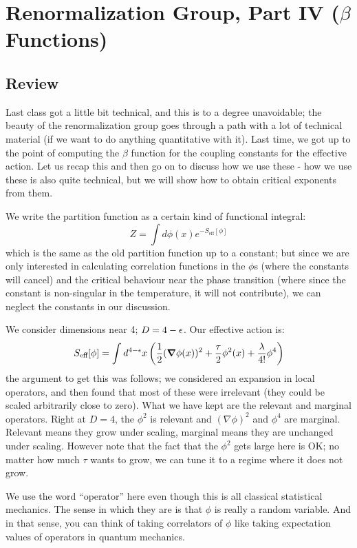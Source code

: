 \section{Renormalization Group, Part IV ($\beta$ Functions)}
\subsection{Review}
Last class got a little bit technical, and this is to a degree unavoidable; the beauty of the renormalization group goes through a path with a lot of technical material (if we want to do anything quantitative with it). Last time, we got up to the point of computing the $\beta$ function for the coupling constants for the effective action. Let us recap this and then go on to discuss how we use these - how we use these is also quite technical, but we will show how to obtain critical exponents from them.

We write the partition function as a certain kind of functional integral:
\begin{equation}
    Z = \int d\phi(x)e^{-S_{\text{eff}}[\phi]}
\end{equation}
which is the same as the old partition function up to a constant; but since we are only interested in calculating correlation functions in the $\phi$s (where the constants will cancel) and the critical behaviour near the phase transition (where since the constant is non-singular in the temperature, it will not contribute), we can neglect the constants in our discussion.

We consider dimensions near 4; $D = 4 - \epsilon$. Our effective action is:
\begin{equation}\label{eq-oldtheory}
    S_{\text{eff}}[\phi] = \int d^{4-\e}x \left(\frac{1}{2}(\nabla \phi(x))^2 + \frac{\tau}{2}\phi^2(x) + \frac{\lambda}{4!}\phi^4\right)
\end{equation}
the argument to get this was follows; we considered an expansion in local operators, and then found that most of these were irrelevant (they could be scaled arbitrarily close to zero). What we have kept are the relevant and marginal operators. Right at $D = 4$, the $\phi^2$ is relevant and $(\nabla \phi)^2$ and $\phi^4$ are marginal. Relevant means they grow under scaling, marginal means they are unchanged under scaling. However note that the fact that the $\phi^2$ gets large here is OK; no matter how much $\tau$ wants to grow, we can tune it to a regime where it does not grow.

We use the word ``operator'' here even though this is all classical statistical mechanics. The sense in which they are is that $\phi$ is really a random variable. And in that sense, you can think of taking correlators of $\phi$ like taking expectation values of operators in quantum mechanics. 

